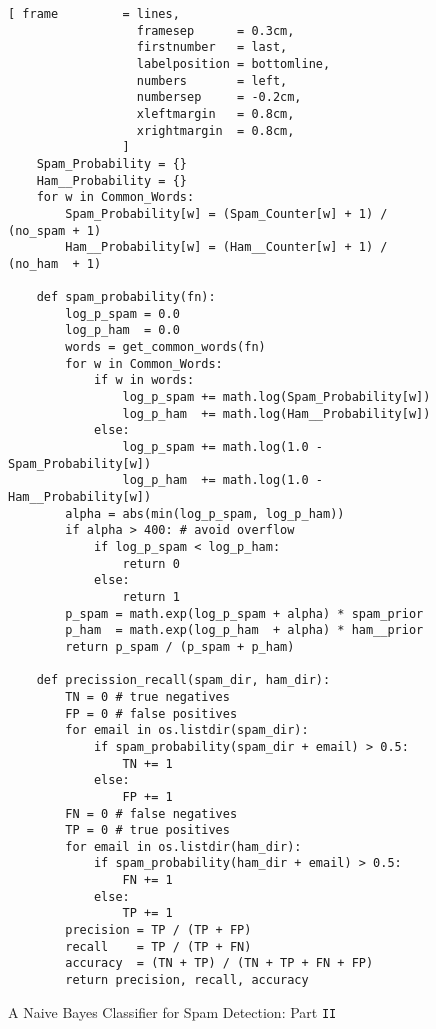 \begin{figure}[!ht]
\centering
\begin{Verbatim}[ frame         = lines, 
                  framesep      = 0.3cm, 
                  firstnumber   = last,
                  labelposition = bottomline,
                  numbers       = left,
                  numbersep     = -0.2cm,
                  xleftmargin   = 0.8cm,
                  xrightmargin  = 0.8cm,
                ]
    Spam_Probability = {}
    Ham__Probability = {}
    for w in Common_Words:
        Spam_Probability[w] = (Spam_Counter[w] + 1) / (no_spam + 1) 
        Ham__Probability[w] = (Ham__Counter[w] + 1) / (no_ham  + 1) 

    def spam_probability(fn):
        log_p_spam = 0.0
        log_p_ham  = 0.0
        words = get_common_words(fn)
        for w in Common_Words:
            if w in words:
                log_p_spam += math.log(Spam_Probability[w])
                log_p_ham  += math.log(Ham__Probability[w])
            else:
                log_p_spam += math.log(1.0 - Spam_Probability[w])
                log_p_ham  += math.log(1.0 - Ham__Probability[w])
        alpha = abs(min(log_p_spam, log_p_ham))
        if alpha > 400: # avoid overflow
            if log_p_spam < log_p_ham:
                return 0
            else:
                return 1
        p_spam = math.exp(log_p_spam + alpha) * spam_prior
        p_ham  = math.exp(log_p_ham  + alpha) * ham__prior
        return p_spam / (p_spam + p_ham)

    def precission_recall(spam_dir, ham_dir):
        TN = 0 # true negatives
        FP = 0 # false positives
        for email in os.listdir(spam_dir):
            if spam_probability(spam_dir + email) > 0.5:
                TN += 1
            else:
                FP += 1
        FN = 0 # false negatives
        TP = 0 # true positives
        for email in os.listdir(ham_dir):
            if spam_probability(ham_dir + email) > 0.5:
                FN += 1
            else:
                TP += 1
        precision = TP / (TP + FP)
        recall    = TP / (TP + FN)
        accuracy  = (TN + TP) / (TN + TP + FN + FP)
        return precision, recall, accuracy
\end{Verbatim}
\vspace*{-0.3cm}
\caption{A Naive Bayes Classifier for Spam Detection: Part \texttt{II}}
\label{fig:Spam-Detection.ipynb-2}
\end{figure}


